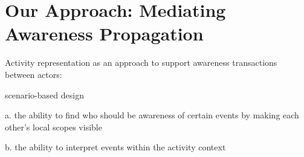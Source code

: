 \graphicspath{{Figures/}}

\chapter{Our Approach: Mediating Awareness Propagation} %
\label{cha:mediate_awareness_propagation}

Activity representation as an approach to support awareness transactions between actors:

scenario-based design

a. the ability to find who should be awareness of certain events by making each other's local scopes visible

b. the ability to interpret events within the activity context





 

